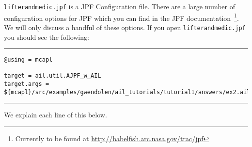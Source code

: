 \texttt{lifterandmedic.jpf} is a JPF Configuration file.  There are a large number of configuration options for JPF which you can find in the JPF documentation~\footnote{Currently to be found at \url{http://babelfish.arc.nasa.gov/trac/jpf}}.  We will only discuss a handful of these options.  If you open \texttt{lifterandmedic.jpf} you should see the following:

\noindent\rule{\textwidth}{1pt}
\begin{small}
\begin{verbatim}
@using = mcapl

target = ail.util.AJPF_w_AIL
target.args = ${mcapl}/src/examples/gwendolen/ail_tutorials/tutorial1/answers/ex2.ail,${mcapl}/src/examples/gwendolen/ajpf_tutorials/tutorial1/lifterandmedic.psl,1

\end{verbatim}
\end{small}
\rule{\textwidth}{1pt}

We explain each line of this below.

